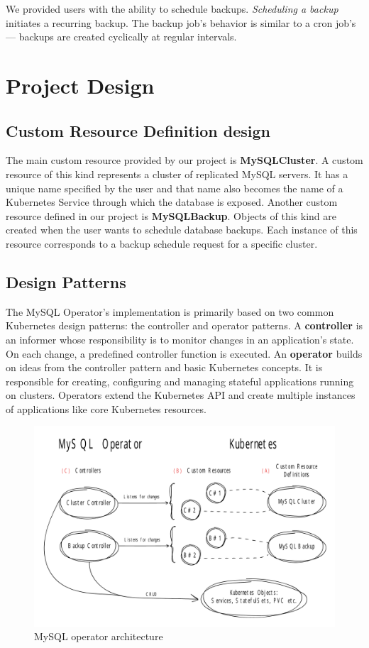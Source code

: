 We provided users with the ability to schedule backups. \textit{Scheduling a backup} initiates a
recurring backup. The backup job’s behavior is similar to a cron job’s --- backups are created
cyclically at regular intervals.

\section{Project Design}

\subsection{Custom Resource Definition design}
The main custom resource provided by our project is \textbf{MySQLCluster}. A custom resource of this kind
represents a cluster of replicated MySQL servers. It has a unique name specified by the user and
that name also becomes the name of a Kubernetes Service through which the database is exposed.
Another custom resource defined in our project is \textbf{MySQLBackup}. Objects of this kind are created when
the user wants to schedule database backups. Each instance of this resource corresponds to a backup
schedule request for a specific cluster.

\subsection{Design Patterns}
The MySQL Operator’s implementation is primarily based on two common Kubernetes design patterns:
the controller and operator patterns. A \textbf{controller} is an informer whose responsibility is
to monitor changes in an application’s state. On each change, a predefined controller function is
executed. An \textbf{operator} builds on ideas from the controller pattern and basic Kubernetes
concepts. It is responsible for creating, configuring and managing stateful applications running on
clusters. Operators extend the Kubernetes API and create multiple instances of applications like
core Kubernetes resources.

\begin{figure}[!ht]
    \centering
    \includegraphics[width=1\textwidth, angle=0]{img/Design.pdf}
    \caption{MySQL operator architecture}
    \label{fig:design}
\end{figure}

